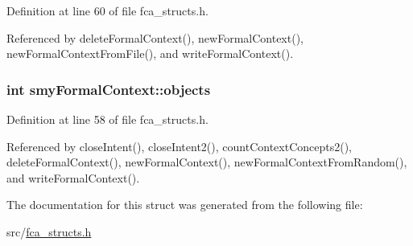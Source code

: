 \-Definition at line 60 of file fca\-\_\-structs.\-h.



\-Referenced by delete\-Formal\-Context(), new\-Formal\-Context(), new\-Formal\-Context\-From\-File(), and write\-Formal\-Context().

\hypertarget{structsmyFormalContext_ab6e220297887bc2af0e612c94132ceb3}{
\subsubsection[{objects}]{\setlength{\rightskip}{0pt plus 5cm}int {\bf smy\-Formal\-Context\-::objects}}}\label{structsmyFormalContext_ab6e220297887bc2af0e612c94132ceb3}


\-Definition at line 58 of file fca\-\_\-structs.\-h.



\-Referenced by close\-Intent(), close\-Intent2(), count\-Context\-Concepts2(), delete\-Formal\-Context(), new\-Formal\-Context(), new\-Formal\-Context\-From\-Random(), and write\-Formal\-Context().



\-The documentation for this struct was generated from the following file\-:\begin{DoxyCompactItemize}
\item 
src/\hyperlink{fca__structs_8h}{fca\-\_\-structs.\-h}\end{DoxyCompactItemize}
